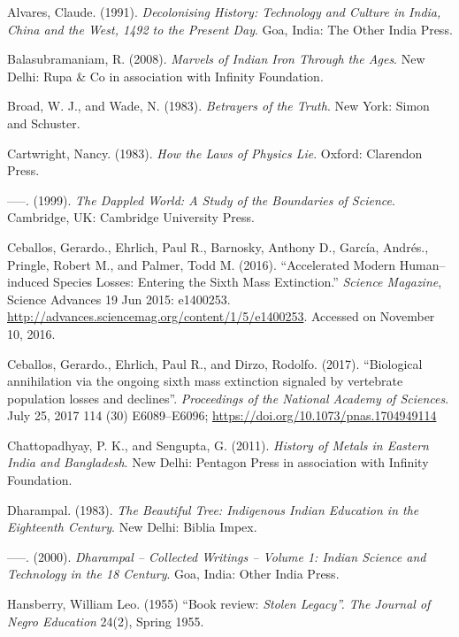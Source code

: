 \begin{thebibliography}{99}
 Alvares, Claude. (1991). \textit{Decolonising History: Technology and Culture in India, China and the West, 1492 to the Present Day}. Goa, India: The Other India Press.

  Balasubramaniam, R. (2008). \textit{Marvels of Indian Iron Through the Ages}. New Delhi: Rupa \& Co in association with Infinity Foundation.

  Broad, W. J., and Wade, N. (1983). \textit{Betrayers of the Truth}. New York: Simon and Schuster.

  Cartwright, Nancy. (1983). \textit{How the Laws of Physics Lie}. Oxford: Clarendon Press.

  –––. (1999). \textit{The Dappled World: A Study of the Boundaries of Science}. Cambridge, UK: Cambridge University Press.

  Ceballos, Gerardo., Ehrlich, Paul R., Barnosky, Anthony D., García, Andrés., Pringle, Robert M., and Palmer, Todd M. (2016). “Accelerated Modern Human–induced Species Losses: Entering the Sixth Mass Extinction.” \textit{Science Magazine}, Science Advances 19 Jun 2015: e1400253. \url{http://advances.sciencemag.org/content/1/5/e1400253}. Accessed on November 10, 2016.

  Ceballos, Gerardo., Ehrlich, Paul R., and Dirzo, Rodolfo. (2017). “Biological annihilation via the ongoing sixth mass extinction signaled by vertebrate population losses and declines”. \textit{Proceedings of the National Academy of Sciences}. July 25, 2017 114 (30) E6089–E6096; \url{https://doi.org/10.1073/pnas.1704949114}

  Chattopadhyay, P. K., and Sengupta, G. (2011). \textit{History of Metals in Eastern India and Bangladesh}. New Delhi: Pentagon Press in association with Infinity Foundation.

  Dharampal. (1983). \textit{The Beautiful Tree: Indigenous Indian Education in the Eighteenth Century}. New Delhi: Biblia Impex.

  –––. (2000). \textit{Dharampal – Collected Writings – Volume 1: Indian Science and Technology in the 18 Century}. Goa, India: Other India Press.

  Hansberry, William Leo. (1955) “Book review: \textit{Stolen Legacy”. The Journal of Negro Education} 24(2), Spring 1955.


\end{thebibliography}
